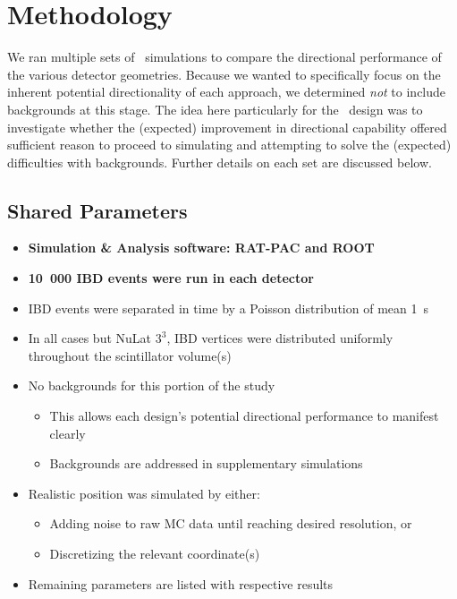 \section{\label{sec:method}Methodology}

We ran multiple sets of \mc\ simulations to compare the directional performance of the various detector geometries.
Because we wanted to specifically focus on the inherent potential directionality of each approach, we determined \emph{not} to include backgrounds at this stage.
The idea here \dash particularly for the \santa\ design \dash was to investigate whether the (expected) improvement in directional capability offered sufficient reason to proceed to simulating and attempting to solve the (expected) difficulties with backgrounds.
Further details on each set are discussed below.

\subsection{\label{subsec:ncomp_params}Shared Parameters}

\begin{itemize}
  \item \textbf{Simulation \& Analysis software: RAT-PAC and ROOT}
  \item \textbf{10~000 IBD events were run in each detector}
  \item IBD events were separated in time by a Poisson distribution of mean 1~s
  \item In all cases but NuLat $3^3$, IBD vertices were distributed uniformly throughout the scintillator volume(s)
  \item No backgrounds for this portion of the study
  \begin{itemize}
    \item This allows each design's potential directional performance to manifest clearly
    \item Backgrounds are addressed in supplementary simulations %
  \end{itemize}
  \item Realistic position was simulated by either:
  \begin{itemize}
   \item Adding noise to raw MC data until reaching desired resolution, or
   \item Discretizing the relevant coordinate(s)
  \end{itemize}
  \item Remaining parameters are listed with respective results
\end{itemize}

